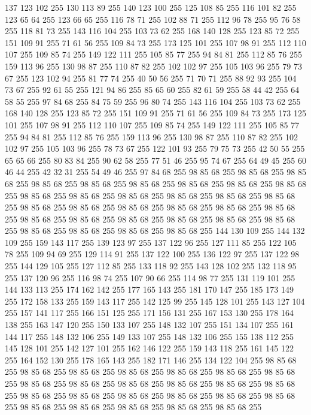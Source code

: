 137 123 102 255 130 113 89 255 140 123 100 255 125 108 85 255 116 101 82 255 123 65 64 255 123 66 65 255 116 78 71 255 102 88 71 255 112 96 78 255 95 76 58 255 118 81 73 255 143 116 104 255 103 73 62 255 168 140 128 255 123 85 72 255 151 109 91 255 71 61 56 255 109 84 73 255 173 125 101 255 107 98 91 255 112 110 107 255 109 85 74 255 149 122 111 255 105 85 77 255 94 84 81 255 112 85 76 255 159 113 96 255 130 98 87 255 110 87 82 255 102 102 97 255 105 103 96 255 79 73 67 255 123 102 94 255 81 77 74 255 40 50 56 255 71 70 71 255 88 92 93 255 104 73 67 255 92 61 55 255 121 94 86 255 85 65 60 255 82 61 59 255 58 44 42 255 64 58 55 255 97 84 68 255 84 75 59 255 96 80 74 255 143 116 104 255 103 73 62 255 168 140 128 255 123 85 72 255 151 109 91 255 71 61 56 255 109 84 73 255 173 125 101 255 107 98 91 255 112 110 107 255 109 85 74 255 149 122 111 255 105 85 77 255 94 84 81 255 112 85 76 255 159 113 96 255
130 98 87 255 110 87 82 255 102 102 97 255 105 103 96 255 78 73 67 255 122 101 93 255 79 75 73 255 42 50 55 255 65 65 66 255 80 83 84 255 90 62 58 255 77 51 46 255 95 74 67 255 64 49 45 255 60 46 44 255 42 32 31 255 54 49 46 255 97 84 68 255 98 85 68 255 98 85 68 255 98 85 68 255 98 85 68 255 98 85 68 255 98 85 68 255 98 85 68 255 98 85 68 255 98 85 68 255 98 85 68 255 98 85 68 255 98 85 68 255 98 85 68 255 98 85 68 255 98 85 68 255 98 85 68 255 98 85 68 255 98 85 68 255 98 85 68 255 98 85 68 255 98 85 68 255 98 85 68 255 98 85 68 255 98 85 68 255 98 85 68 255 98 85 68 255 98 85 68 255 98 85 68 255 98 85 68 255 98 85 68 255 98 85 68 255 144 130 109 255 144 132 109 255 159 143 117 255 139 123 97 255 137 122 96 255 127 111 85 255 122 105 78 255 109 94 69 255 129 114 91 255 137 122 100 255 136 122 97 255 137 122 98 255 144 129 105 255 127 112 85 255 133 118 92 255
143 128 102 255 132 118 95 255 137 120 96 255 116 98 74 255 107 90 66 255 114 98 77 255 131 119 101 255 144 133 113 255 174 162 142 255 177 165 143 255 181 170 147 255 185 173 149 255 172 158 133 255 159 143 117 255 142 125 99 255 145 128 101 255 143 127 104 255 157 141 117 255 166 151 125 255 171 156 131 255 167 153 130 255 178 164 138 255 163 147 120 255 150 133 107 255 148 132 107 255 151 134 107 255 161 144 117 255 148 132 106 255 149 133 107 255 148 132 106 255 155 138 112 255 145 128 101 255 142 127 101 255 162 146 122 255 159 143 118 255 161 145 122 255 164 152 130 255 178 165 143 255 182 171 146 255 134 122 104 255 98 85 68 255 98 85 68 255 98 85 68 255 98 85 68 255 98 85 68 255 98 85 68 255 98 85 68 255 98 85 68 255 98 85 68 255 98 85 68 255 98 85 68 255 98 85 68 255 98 85 68 255 98 85 68 255 98 85 68 255 98 85 68 255 98 85 68 255 98 85 68 255 98 85 68 255 98 85 68 255 98 85 68 255 98 85 68 255 98 85 68 255 98 85 68 255
